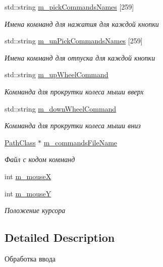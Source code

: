 \begin{DoxyCompactItemize}
std\+::string \hyperlink{class_input_class_a6345bf3d141b9092bfbad05449ca0859}{m\+\_\+pick\+Commands\+Names} \mbox{[}259\mbox{]}
\begin{DoxyCompactList}\small\item\em Имена комманд для нажатия для каждой кнопки \end{DoxyCompactList}\item 
std\+::string \hyperlink{class_input_class_a834ce66d4c8c80df12d7a8070d4aab2a}{m\+\_\+un\+Pick\+Commands\+Names} \mbox{[}259\mbox{]}
\begin{DoxyCompactList}\small\item\em Имена комманд для отпуска для каждой кнопки \end{DoxyCompactList}\item 
std\+::string \hyperlink{class_input_class_a636e5eea20ce8e5bf9851f9cbcd19cc4}{m\+\_\+up\+Wheel\+Command}
\begin{DoxyCompactList}\small\item\em Комманда для прокрутки колеса мыши вверх \end{DoxyCompactList}\item 
std\+::string \hyperlink{class_input_class_a0516cd35aa419204c0beca88e0cb3e3e}{m\+\_\+down\+Wheel\+Command}
\begin{DoxyCompactList}\small\item\em Комманда для прокрутки колеса мыши вниз \end{DoxyCompactList}\item 
\hyperlink{class_path_class}{Path\+Class} $\ast$ \hyperlink{class_input_class_a766a94a9e69d9f18b967b37a54ae5365}{m\+\_\+commands\+File\+Name}
\begin{DoxyCompactList}\small\item\em Файл с кодом комманд \end{DoxyCompactList}\item 
int \hyperlink{class_input_class_a9066eae901d347df0c15d954d1c772db}{m\+\_\+mouseX}
\item 
int \hyperlink{class_input_class_a81ccc085f069fe97e28fbbb9bc9b3b22}{m\+\_\+mouseY}
\begin{DoxyCompactList}\small\item\em Положение курсора \end{DoxyCompactList}\end{DoxyCompactItemize}


\subsection{Detailed Description}
Обработка ввода 

